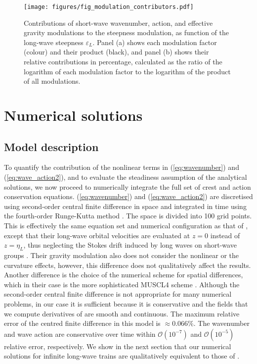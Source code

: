 \documentclass[lineno]{jfm}
\begin{document}
\begin{figure}
\centering
\texttt{[image: figures/fig\_modulation\_contributors.pdf]}
\caption{
  Contributions of short-wave wavenumber, action, and effective gravity
  modulations to the steepness modulation, as function of the long-wave
  steepness $\varepsilon_L$.
  Panel (a) shows each modulation factor (colour) and their product (black),
  and panel (b) shows their relative contributions in percentage, calculated as
  the ratio of the logarithm of each modulation factor to the logarithm of the
  product of all modulations.
}
\label{fig:modulation_contributors}
\end{figure}

\section{Numerical solutions}
\label{section:numerical_solutions}

\subsection{Model description}

To quantify the contribution of the nonlinear terms in (\ref{eq:wavenumber})
and (\ref{eq:wave_action2}), and to evaluate the steadiness assumption of the
analytical solutions, we now proceed to numerically integrate the full set of
crest and action conservation equations.
(\ref{eq:wavenumber}) and (\ref{eq:wave_action2}) are discretised using
second-order central finite difference in space and integrated in time using the
fourth-order Runge-Kutta method \citep{butcher1996runge}.
The space is divided into 100 grid points.
This is effectively the same equation set and numerical configuration as that of
\citet{peureux2021unsteady}, except that their long-wave orbital velocities are
evaluated at $z=0$ instead of $z=\eta_L$, thus neglecting the Stokes drift
induced by long waves on short-wave groups
\citep{stokes1847,van2018stokes,monismith2020stokes}.
Their gravity modulation also does not consider the nonlinear or the curvature
effects, however, this difference does not qualitatively affect the results.
Another difference is the choice of the numerical scheme for spatial differences,
which in their case is the more sophisticated MUSCL4 scheme \citep{kurganov2000new}.
Although the second-order central finite difference is not appropriate for many
numerical problems, in our case it is sufficient because it is conservative and
the fields that we compute derivatives of are smooth and continuous.
The maximum relative error of the centred finite difference in this model
is $\approx 0.066\%$.
The wavenumber and wave action are conservative over time within
$\mathcal{O}(10^{-7})$ and $\mathcal{O}(10^{-5})$ relative error, respectively.
We show in the next section that our numerical solutions for infinite long-wave
trains are qualitatively equivalent to those of \citet{peureux2021unsteady}.
\end{document}
